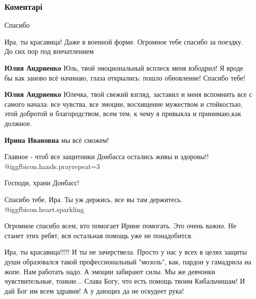  
 
 
 
 
\subsubsection{Коментарі}
\label{sec:24_11_2021.fb.poltorackaja_irina.dnr.1.zaschitniki.cmt}

\begin{itemize} %
Спасибо

Ира, ты красавица! Даже в военной форме. Огромное тебе спасибо за поездку. До сих пор под впечатлением

\begin{itemize} %
\textbf{Юлия Андриенко} Юль, твой эмоциональный всплеск меня взбодрил! Я вроде бы как заново всё начинаю, глаза открылись: пошло обновление! Спасибо тебе!

\textbf{Юлия Андриенко} Юлечка, твой свежий взгляд, заставил и меня вспомнить все с самого начала: все чувства, все эмоции, восхищение мужеством и стойкостью, этой добротой и благородством, всем тем, к чему я привыкла и принимаю,как должное.

\textbf{Ирина Ивановна} мы всё сможем!
\end{itemize} %

Главное - чтоб все защитники Донбасса остались живы и здоровы!!  @igg{fbicon.hands.pray}{repeat=3} 

Господи, храни Донбасс!

Спасибо тебе, Ира. Ты уж держись, все вы там держитесь.  @igg{fbicon.heart.sparkling} 

Огромное спасибо всем, кто помогает Ирине помогать. Это очень важно. Не станет этих ребят, вся остальная помощь уже не понадобится.


Ира, ты красавица!!!!! И ты не зачерствела. Просто у нас у всех в целях защиты
души образовался такой профессиональный "мозоль", как, пардон у гамадрила на
жопе. Нам работать надо. А эмоции забирают силы. Мы же девчонки чувствительные,
тонкие... Слава Богу, что есть помощь твоим Кибальчишам! И дай Бог им всем
здравия! А у дающих да не оскудеет рука!


\end{itemize}
